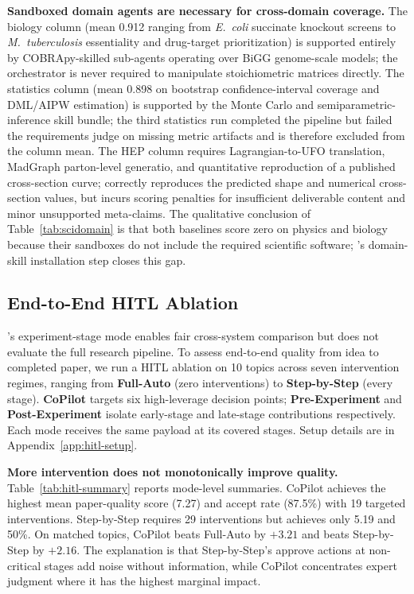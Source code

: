 \noindent \textbf{Sandboxed domain agents are necessary for cross-domain coverage.}
The biology column (mean 0.912 ranging from \emph{E.~coli} succinate knockout screens to \emph{M.~tuberculosis} essentiality and drug-target prioritization) is supported entirely by COBRApy-skilled sub-agents operating over BiGG genome-scale models; the orchestrator is never required to manipulate stoichiometric matrices directly.
The statistics column (mean 0.898 on bootstrap confidence-interval coverage and DML/AIPW estimation) is supported by the Monte Carlo and semiparametric-inference skill bundle; the third statistics run completed the pipeline but failed the requirements judge on missing metric artifacts and is therefore excluded from the column mean.
The HEP column requires Lagrangian-to-UFO translation, MadGraph parton-level generatio, and quantitative reproduction of a published cross-section curve; \system{} correctly reproduces the predicted shape and numerical cross-section values, but incurs scoring penalties for insufficient deliverable content and minor unsupported meta-claims.
The qualitative conclusion of Table~\ref{tab:scidomain} is that both baselines score zero on physics and biology because their sandboxes do not include the required scientific software; \system{}'s domain-skill installation step closes this gap.

\vspace{-0.3em}
\subsection{End-to-End HITL Ablation}
\label{sec:hitl_exp}
\vspace{-0.3em}

\bench{}'s experiment-stage mode enables fair cross-system comparison but does not evaluate the full research pipeline. To assess end-to-end quality from idea to completed paper, we run a HITL ablation on 10 \bench{} topics across seven intervention regimes, ranging from \textbf{Full-Auto} (zero interventions) to \textbf{Step-by-Step} (every stage). \textbf{CoPilot} targets six high-leverage decision points; \textbf{Pre-Experiment} and \textbf{Post-Experiment} isolate early-stage and late-stage contributions respectively. Each mode receives the same payload at its covered stages. Setup details are in Appendix~\ref{app:hitl-setup}.

\noindent \textbf{More intervention does not monotonically improve quality.} Table~\ref{tab:hitl-summary} reports mode-level summaries. CoPilot achieves the highest mean paper-quality score (7.27) and accept rate (87.5\%) with 19 targeted interventions. Step-by-Step requires 29 interventions but achieves only 5.19 and 50\%. On matched topics, CoPilot beats Full-Auto by $+3.21$ and beats Step-by-Step by $+2.16$. The explanation is that Step-by-Step's approve actions at non-critical stages add noise without information, while CoPilot concentrates expert judgment where it has the highest marginal impact.


